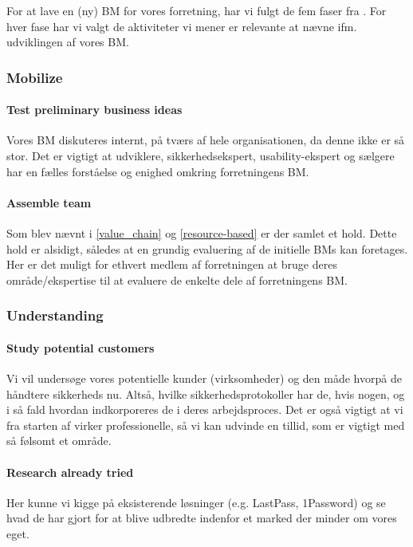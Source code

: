 For at lave en (ny) BM for vores forretning, har vi fulgt de fem faser fra \citet[pp. 244-259]{osterwalder2009business}.
For hver fase har vi valgt de aktiviteter vi mener er relevante at nævne ifm. udviklingen af vores BM.

\subsubsection{Mobilize}
\paragraph{Test preliminary business ideas}
Vores BM diskuteres internt, på tværs af hele organisationen, da denne ikke er så stor.
Det er vigtigt at udviklere, sikkerhedsekspert, usability-ekspert og sælgere har en fælles forståelse og enighed omkring forretningens BM.

\paragraph{Assemble team}
Som blev nævnt i \cref{value_chain} og \cref{resource-based} er der samlet et hold.
Dette hold er alsidigt, således at en grundig evaluering af de initielle BMs kan foretages.
Her er det muligt for ethvert medlem af forretningen at bruge deres område/ekspertise til at evaluere de enkelte dele af forretningens BM.

\subsubsection{Understanding}
\paragraph{Study potential customers}
Vi vil undersøge vores potentielle kunder (virksomheder) og den måde hvorpå de håndtere sikkerheds nu.
Altså, hvilke sikkerhedsprotokoller har de, hvis nogen, og i så fald hvordan indkorporeres de i deres arbejdsproces.
Det er også vigtigt at vi fra starten af virker professionelle, så vi kan udvinde en tillid, som er vigtigt med så følsomt et område.

\paragraph{Research already tried}
Her kunne vi kigge på eksisterende løsninger (e.g. LastPass, 1Password) og se hvad de har gjort for at blive udbredte indenfor et marked der minder om vores eget.

